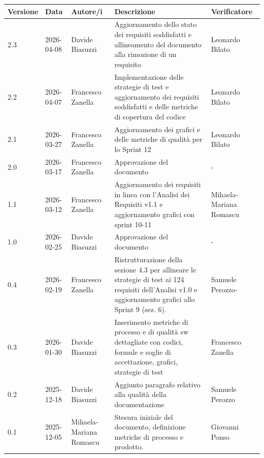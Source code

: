 \documentclass[a4paper,11pt,oneside]{scrartcl}
\begin{document}
\begin{center}
\renewcommand{\arraystretch}{1.5}
\begin{tabularx}{\textwidth}{@{}p{}p{}p{}X>{\centering\arraybackslash}p{}@{}}
\toprule
\textbf{Versione} & \textbf{Data} & \textbf{Autore/i} & \textbf{Descrizione} & \textbf{Verificatore} \\
\midrule
2.3 & 2026-04-08 & Davide Biasuzzi & Aggiornamento dello stato dei requisiti soddisfatti e allineamento del documento alla rimozione di un requisito & Leonardo Bilato\\
2.2 & 2026-04-07 & Francesco Zanella & Implementazione delle strategie di test e aggiornamento dei requisiti soddisfatti e delle metriche di copertura del codice & Leonardo Bilato\\
2.1 & 2026-03-27 & Francesco Zanella & Aggiornamento dei grafici e delle metriche di qualità per lo Sprint 12 & Leonardo Bilato\\
2.0 & 2026-03-17 & Francesco Zanella & Approvazione del documento & -\\
1.1 & 2026-03-12 & Francesco Zanella & Aggiornamento dei requisiti in linea con l'Analisi dei Requisiti v1.1 e aggiornamento grafici con sprint 10-11 & Mihaela-Mariana Romascu\\
1.0 & 2026-02-25 & Davide Biasuzzi & Approvazione del documento & -\\
0.4 & 2026-02-19 & Francesco Zanella & Ristrutturazione della sezione 4.3 per allineare le strategie di test ai 124 requisiti dell'Analisi v1.0 e aggiornamento grafici allo Sprint 9 (sez. 6). & Samuele Perozzo-\\
0.3 & 2026-01-30 & Davide Biasuzzi & Inserimento metriche di processo e di qualità sw dettagliate con codici, formule e soglie di accettazione, grafici, strategie di test & Francesco Zanella\\
0.2 & 2025-12-18 & Davide Biasuzzi & Aggiunto paragrafo relativo alla qualità della documentazione & Samuele Perozzo\\
0.1 & 2025-12-05 & Mihaela-Mariana Romascu & Stesura iniziale del documento, definizione metriche di processo e prodotto. & Giovanni Ponso\\
\bottomrule
\end{tabularx}
\end{center}

\newpage
\tableofcontents
\newpage
\end{document}
